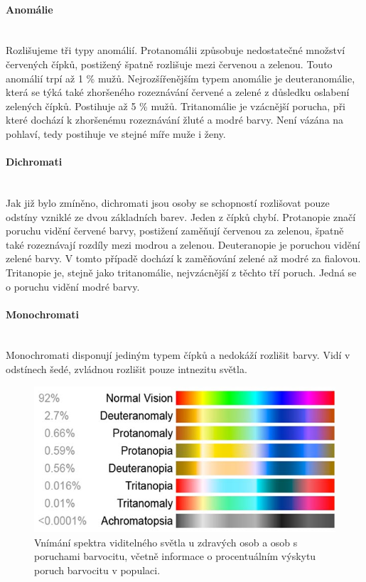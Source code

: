 \paragraph{Anomálie}\mbox{}\\
Rozlišujeme tři typy anomálií. Protanomálii způsobuje nedostatečné množství červených čípků, postižený špatně rozlišuje mezi červenou a zelenou. Touto anomálií trpí
až 1 \% mužů. Nejrozšířenějším typem anomálie je deuteranomálie, která se týká také zhoršeného rozeznávání červené a zelené z důsledku oslabení zelených čípků. Postihuje
až 5 \% mužů. Tritanomálie je vzácnější porucha, při které dochází k zhoršenému rozeznávání žluté a modré barvy. Není vázána na pohlaví, tedy postihuje ve stejné míře muže
i ženy.

\paragraph{Dichromati}\mbox{}\\
Jak již bylo zmíněno, dichromati jsou osoby se schopností rozlišovat pouze odstíny vzniklé ze dvou základních barev. Jeden z čípků chybí. Protanopie značí poruchu vidění
červené barvy, postižení zaměňují červenou za zelenou, špatně také rozeznávají rozdíly mezi modrou a zelenou. Deuteranopie je poruchou vidění zelené barvy. V tomto případě dochází k zaměňování
zelené až modré za fialovou. Tritanopie je, stejně jako tritanomálie, nejvzácnější z těchto tří poruch. Jedná se o poruchu vidění modré barvy.

\paragraph{Monochromati}\mbox{}\\
Monochromati disponují jediným typem čípků a nedokáží rozlišit barvy. Vidí v odstínech šedé, zvládnou rozlišit pouze intnezitu světla.

\begin{figure}[!ht]
    \centering
    \includegraphics[width=\linewidth]{images/Colour_blindness_chart.jpg}
    \caption{Vnímání spektra viditelného světla u zdravých osob a osob s poruchami barvocitu, 
    včetně informace o procentuálním výskytu poruch barvocitu v populaci.~\cite{lenstore_color_blindness}}
    \label{fig:Vnímání}
\end{figure}

